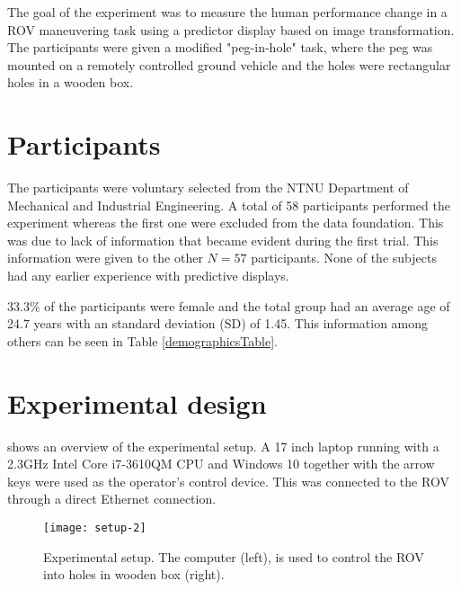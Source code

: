 The goal of the experiment was to measure the human performance change in a ROV maneuvering task using a predictor display based on image transformation. The participants were given a modified "peg-in-hole" task, where the peg was mounted on a remotely controlled ground vehicle and the holes were rectangular holes in a wooden box.


\section{Participants}

The participants were voluntary selected from the NTNU Department of Mechanical and Industrial Engineering. A total of 58 participants performed the experiment whereas the first one were excluded from the data foundation. This was due to lack of information that became evident during the first trial. This information were given to the other $N=57$ participants. None of the subjects had any earlier experience with predictive displays.

33.3\% of the participants were female and the total group had an average age of 24.7 years with an standard deviation (SD) of 1.45. This information among others can be seen in Table \ref{demographicsTable}.

\clearpage
\section{Experimental design}

 shows an overview of the experimental setup. A 17 inch laptop running with a 2.3GHz Intel Core i7-3610QM CPU and Windows 10 together with the arrow keys were used as the operator's control device. This was connected to the ROV through a direct Ethernet connection. 

\begin{figure}[h!]
    \centering
    \texttt{[image: setup-2]}
    \caption{Experimental setup. The computer (left), is used to control the ROV into holes in wooden box (right).}
    \label{expsetup}
\end{figure}

